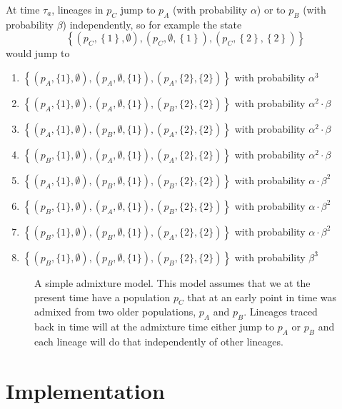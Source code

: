 At time $\tau_a$, lineages in $p_C$ jump to $p_A$ (with probability $\alpha$) or to $p_B$ (with probability $\beta$) independently, so for example the state 
\[\left\{
	\left(p_C,\left\{1\right\},\emptyset\right),
	\left(p_C,\emptyset,\left\{1\right\}\right),
	\left(p_C,\left\{2\right\},\left\{2\right\}\right)
 \right\}
\]
would jump to
\begin{enumerate}
	\item $\left\{(p_A,\{1\},\emptyset), (p_A,\emptyset,\{1\}), (p_A,\{2\},\{2\})\right\}$ with probability $\alpha^3$
	\item $\left\{(p_A,\{1\},\emptyset), (p_A,\emptyset,\{1\}), (p_B,\{2\},\{2\})\right\}$ with probability $\alpha^2\cdot\beta$
	\item $\left\{(p_A,\{1\},\emptyset), (p_B,\emptyset,\{1\}), (p_A,\{2\},\{2\})\right\}$ with probability $\alpha^2\cdot\beta$
	\item $\left\{(p_B,\{1\},\emptyset), (p_A,\emptyset,\{1\}), (p_A,\{2\},\{2\})\right\}$ with probability $\alpha^2\cdot\beta$
	\item $\left\{(p_A,\{1\},\emptyset), (p_B,\emptyset,\{1\}), (p_B,\{2\},\{2\})\right\}$ with probability $\alpha\cdot\beta^2$
	\item $\left\{(p_B,\{1\},\emptyset), (p_A,\emptyset,\{1\}), (p_B,\{2\},\{2\})\right\}$ with probability $\alpha\cdot\beta^2$
	\item $\left\{(p_B,\{1\},\emptyset), (p_B,\emptyset,\{1\}), (p_A,\{2\},\{2\})\right\}$ with probability $\alpha\cdot\beta^2$
	\item $\left\{(p_B,\{1\},\emptyset), (p_B,\emptyset,\{1\}), (p_B,\{2\},\{2\})\right\}$ with probability $\beta^3$
\end{enumerate}

\begin{figure}[tb]
  \caption{A simple admixture model. This model assumes that we at the present time have a population $p_C$ that at an early point in time was admixed from two older populations, $p_A$ and $p_B$. Lineages traced back in time will at the admixture time either jump to $p_A$ or $p_B$ and each lineage will do that independently of other lineages.}
  \label{fig:demographic-model-admixture-model}
\end{figure}



\section{Implementation}

